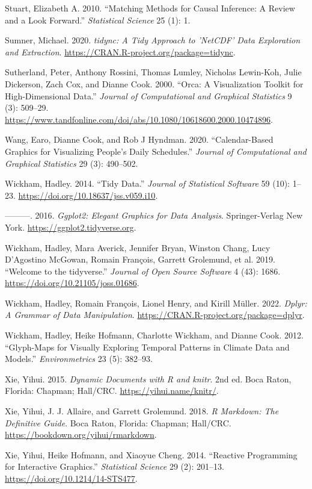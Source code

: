 \documentclass{article}
\newlength{\cslhangindent}
\newlength{\cslentryspacingunit} %
\newenvironment{CSLReferences}[2] %
 {%
  \setlength{\parindent}{0pt}
  \ifodd #1
  \let\oldpar\par
  \def\par{\hangindent=\cslhangindent\oldpar}
  \fi
  \setlength{\parskip}{#2\cslentryspacingunit}
 }%
 {}
\begin{document}
\begin{CSLReferences}{1}{0}
\leavevmode\hypertarget{ref-stuart2010matching}{}%
Stuart, Elizabeth A. 2010. {``Matching Methods for Causal Inference: A Review and a Look Forward.''} \emph{Statistical Science} 25 (1): 1.

\leavevmode\hypertarget{ref-tidync}{}%
Sumner, Michael. 2020. \emph{{tidync}: A Tidy Approach to 'NetCDF' Data Exploration and Extraction}. \url{https://CRAN.R-project.org/package=tidync}.

\leavevmode\hypertarget{ref-sutherland2000orca}{}%
Sutherland, Peter, Anthony Rossini, Thomas Lumley, Nicholas Lewin-Koh, Julie Dickerson, Zach Cox, and Dianne Cook. 2000. {``{Orca}: A Visualization Toolkit for High-Dimensional Data.''} \emph{Journal of Computational and Graphical Statistics} 9 (3): 509--29. \url{https://www.tandfonline.com/doi/abs/10.1080/10618600.2000.10474896}.

\leavevmode\hypertarget{ref-wang2020calendar}{}%
Wang, Earo, Dianne Cook, and Rob J Hyndman. 2020. {``Calendar-Based Graphics for Visualizing People's Daily Schedules.''} \emph{Journal of Computational and Graphical Statistics} 29 (3): 490--502.

\leavevmode\hypertarget{ref-tidydata}{}%
Wickham, Hadley. 2014. {``Tidy Data.''} \emph{Journal of Statistical Software} 59 (10): 1--23. \url{https://doi.org/10.18637/jss.v059.i10}.

\leavevmode\hypertarget{ref-ggplot2}{}%
---------. 2016. \emph{Ggplot2: Elegant Graphics for Data Analysis}. Springer-Verlag New York. \url{https://ggplot2.tidyverse.org}.

\leavevmode\hypertarget{ref-tidyverse}{}%
Wickham, Hadley, Mara Averick, Jennifer Bryan, Winston Chang, Lucy D'Agostino McGowan, Romain François, Garrett Grolemund, et al. 2019. {``Welcome to the {tidyverse}.''} \emph{Journal of Open Source Software} 4 (43): 1686. \url{https://doi.org/10.21105/joss.01686}.

\leavevmode\hypertarget{ref-dplyr}{}%
Wickham, Hadley, Romain François, Lionel Henry, and Kirill Müller. 2022. \emph{Dplyr: A Grammar of Data Manipulation}. \url{https://CRAN.R-project.org/package=dplyr}.

\leavevmode\hypertarget{ref-Wickham2012-yr}{}%
Wickham, Hadley, Heike Hofmann, Charlotte Wickham, and Dianne Cook. 2012. {``Glyph-Maps for Visually Exploring Temporal Patterns in Climate Data and Models.''} \emph{Environmetrics} 23 (5): 382--93.

\leavevmode\hypertarget{ref-knitr}{}%
Xie, Yihui. 2015. \emph{Dynamic Documents with {R} and {knitr}}. 2nd ed. Boca Raton, Florida: Chapman; Hall/CRC. \url{https://yihui.name/knitr/}.

\leavevmode\hypertarget{ref-rmarkdown}{}%
Xie, Yihui, J. J. Allaire, and Garrett Grolemund. 2018. \emph{R Markdown: The Definitive Guide}. Boca Raton, Florida: Chapman; Hall/CRC. \url{https://bookdown.org/yihui/rmarkdown}.

\leavevmode\hypertarget{ref-xie2014reactive}{}%
Xie, Yihui, Heike Hofmann, and Xiaoyue Cheng. 2014. {``{Reactive Programming for Interactive Graphics}.''} \emph{Statistical Science} 29 (2): 201--13. \url{https://doi.org/10.1214/14-STS477}.

\end{CSLReferences}



\end{document}
